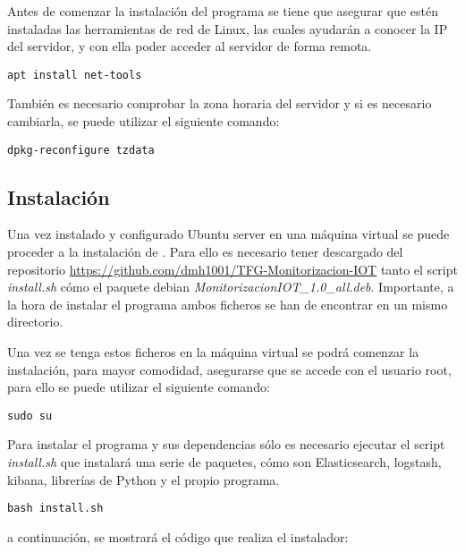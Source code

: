 Antes de comenzar la instalación del programa se tiene que asegurar que estén instaladas las herramientas de red de Linux, las cuales ayudarán a conocer la IP del servidor, y con ella poder acceder al servidor de forma remota.


\begin{lstlisting}[frame=single] 
apt install net-tools
\end{lstlisting}

También es necesario comprobar la zona horaria del servidor y si es necesario cambiarla, se puede utilizar el siguiente comando:


\begin{lstlisting}[frame=single] 
dpkg-reconfigure tzdata
\end{lstlisting}

\subsection{Instalación \nombrePrograma}

Una vez instalado y configurado Ubuntu server en una máquina virtual se puede proceder a la instalación de \nombrePrograma. Para ello es necesario tener descargado del repositorio \url{https://github.com/dmh1001/TFG-Monitorizacion-IOT} tanto el script \textit{install.sh} cómo el paquete debian \textit{MonitorizacionIOT\_1.0\_all.deb}. Importante, a la hora de instalar el programa ambos ficheros se han de encontrar en un mismo directorio. 

Una vez se tenga estos ficheros en la máquina virtual se podrá comenzar la instalación, para mayor comodidad, asegurarse que se accede con el usuario root, para ello se puede utilizar el siguiente comando:

\begin{lstlisting}[frame=single] 
sudo su
\end{lstlisting}

Para instalar el programa y sus dependencias sólo es necesario ejecutar el script \textit{install.sh} que instalará una serie de paquetes, cómo son Elasticsearch, logstash, kibana, librerías de Python y el propio programa. 

\begin{lstlisting}[frame=single] 
bash install.sh
\end{lstlisting}

a continuación, se mostrará el código que realiza el instalador:

